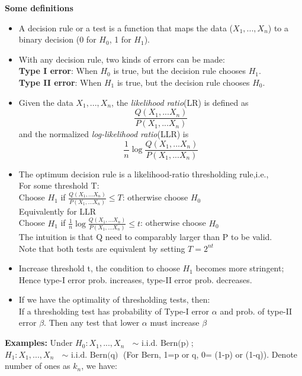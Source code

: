 \documentclass[12pt]{article}
\begin{document}
\textbf{Some definitions}
\begin{itemize}
    \item A decision rule or a test is a function that maps the data ($X_1,...,X_n$) to a binary decision (0 for $H_0$, 1 for $H_1$).
    \item With any decision rule, two kinds of errors can be made: \\
    \textbf{Type I error}: When $H_0$ is true, but the decision rule chooses $H_1$.\\
    \textbf{Type II error}: When $H_1$ is true, but the decision rule chooses $H_0$.
    \item Given the data $X_1,...,X_n$, the \textit{likelihood ratio}(LR) is defined as 
    \[
        \frac{Q(X_1,...X_n)}{P(X_1,...X_n)}
    \]
    and the normalized \textit{log-likelihood ratio}(LLR) is 
    \[
    \frac{1}{n}\log\frac{Q(X_1,...X_n)}{P(X_1,...X_n)}
    \]
    \item The optimum decision rule is a likelihood-ratio thresholding rule,i.e.,\\
    For some threshold T:\\
    \hspace*{10mm} Choose $H_1$ if $\frac{Q(X_1,...X_n)}{P(X_1,...X_n)} \le T$: otherwise choose $H_0$ \\
    Equivalently for LLR\\
    \hspace*{10mm} Choose $H_1$ if $\frac{1}{n}\log\frac{Q(X_1,...X_n)}{P(X_1,...X_n)} \le t$: otherwise choose $H_0$ \\
    The intuition is that Q need to comparably larger than P to be valid.\\
    Note that both tests are equivalent by setting $T= 2^{nt}$
    
    \item Increase threshold t, the condition to choose $H_1$ becomes more stringent; Hence type-I error prob. increases, type-II error prob. decreases.  
    \item If we have the optimality of thresholding tests, then: \\
    If a thresholding test has probability of Type-I error $\alpha$ and prob. of type-II error $\beta$. Then any test that lower $\alpha$ must increase $\beta$
    \end{itemize}
\textbf{Examples:} Under $H_0: X_1,...,X_n \textrm{ $\sim$ i.i.d. Bern(p)} $;  $H_1: X_1,...,X_n \textrm{ $\sim$ i.i.d. Bern(q)} $ (For Bern, 1=p or q, 0= (1-p) or (1-q)). Denote number of ones as $k_n$, we have:
\end{document}
